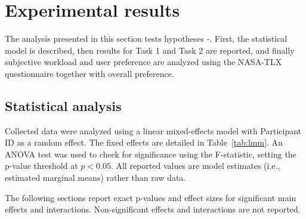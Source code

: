 \section{Experimental results}
\label{sec:magnification-results}

The analysis presented in this section tests hypotheses \hypperformance-\hyppreference.  First, the statistical model is described, then results for Task 1 and Task 2 are reported, and finally subjective workload and user preference are analyzed using the NASA-TLX questionnaire together with overall preference.

\subsection{Statistical analysis}

Collected data were analyzed using a linear mixed-effects model with Participant ID as a random effect. The fixed effects are detailed in Table~\ref{tab:lmm}. An ANOVA test was used to check for significance using the F-statistic, setting the p-value threshold at $p < 0.05$. All reported values are model estimates (i.e., estimated marginal means) rather than raw data. 

The following sections report exact p-values and effect sizes for significant main effects and interactions. Non-significant effects and interactions are not reported. 


